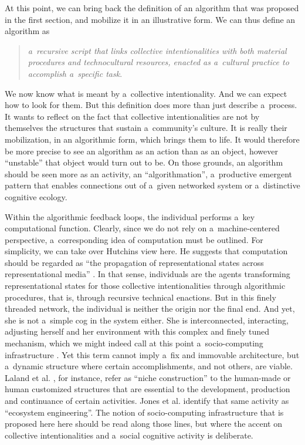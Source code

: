 At this point, we can bring back the definition of an algorithm that was proposed in the first section, and mobilize it in an illustrative form. We can thus define an algorithm as

\begin{quotation}
\textit{a~recursive script that links collective intentionalities with both material procedures and technocultural resources, enacted as a~cultural practice to accomplish a~specific task}.

\end{quotation}
We now know what is meant by a~collective intentionality. And we can expect how to look for them. But this definition does more than just describe a~process. It wants to reflect on the fact that collective intentionalities are not by themselves the structures that sustain a~community's culture. It is really their mobilization, in an algorithmic form, which brings them to life. It would therefore be more precise to see an algorithm as an action than as an object, however ``unstable'' that object would turn out to be. On those grounds, an algorithm should be seen more as an activity, an ``algorithmation'', a~productive emergent pattern that enables connections out of a~given networked system or a~distinctive cognitive ecology.

Within the algorithmic feedback loops, the individual performs a~key computational function. Clearly, since we do not rely on a~machine-centered perspective, a~corresponding idea of computation must be outlined. For simplicity, we can take over Hutchins view here. He suggests that computation should be regarded as ``the propagation of representational states across representational media''
\parencite[][p.118]{hutchins_cognition_1995}. %
 In that sense, individuals are the agents transforming representational states for those collective intentionalities through algorithmic procedures, that is, through recursive technical enactions. But in this finely threaded network, the individual is neither the origin nor the final end. And yet, she is not a~simple cog in the system either. She is interconnected, interacting, adjusting herself and her environment with this complex and finely tuned mechanism, which we might indeed call at this point a~socio-computing infrastructure 
\parencite[][]{toscano_intentionalities_nodate}. %
 Yet this term cannot imply a~fix and immovable architecture, but a~dynamic structure where certain accomplishments, and not others, are viable. Laland et al. 
\parencite*[][p.130]{laland_niche_2000}, %
 for instance, refer as ``niche construction'' to the human-made or human customized structures that are essential to the development, production and continuance of certain activities. Jones et al. 
\parencite*[][]{clark_being_1997} %
 identify that same activity as ``ecosystem engineering''. The notion of socio-computing infrastructure that is proposed here here should be read along those lines, but where the accent on collective intentionalities and a~social cognitive activity is deliberate.


